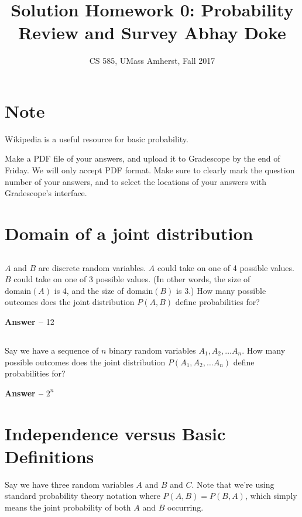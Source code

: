 \documentclass[11pt,letterpaper]{article}
\title{
    \textbf{Solution} Homework 0: Probability Review and Survey
    Abhay Doke
}
\author{CS 585, UMass Amherst, Fall 2017}
\date{}
\theoremstyle{definition}
\begin{document}
\maketitle

\newcommand{\spaceplz}{\vspace{1in}}

\section*{Note}

Wikipedia is a useful resource for basic probability.

Make a PDF file of your answers, and upload it to Gradescope by the end of Friday.  We will only accept PDF format.  Make sure to clearly mark the question number of your answers, and to select the locations of your answers with Gradescope's interface.

\section{Domain of a joint distribution}

\subsection{}

$A$ and $B$ are discrete random variables.  $A$ could take on one of 4 possible values.  $B$ could take on one of 3 possible values.  (In other words, the size of $\text{domain}(A)$ is 4, and the size of $\text{domain}(B)$ is 3.)  How many possible outcomes does the joint distribution $P(A,B)$ define probabilities for?

\textbf{ Answer -- }12

\subsection{}
Say we have a sequence of $n$ binary random variables
$A_1, A_2,\ldots A_n$.  How many possible outcomes
does the joint distribution $P(A_1,A_2,\ldots A_n)$ define probabilities for?

\textbf{ Answer -- }$2^{n}$

\section{Independence versus Basic Definitions}

Say we have three random variables $A$ and $B$ and $C$.
Note that we're using standard probability theory notation where $P(A,B)=P(B,A)$,
which simply means the joint probability of both $A$ and $B$ occurring.
\end{document}
